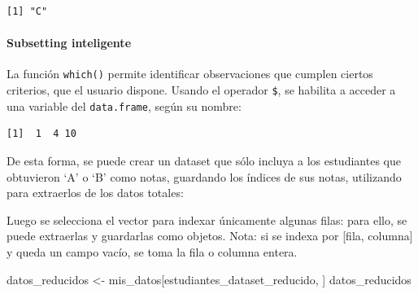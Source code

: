 \documentclass[
]{article}
\newenvironment{Shaded}{\begin{snugshade}}{\end{snugshade}}
\newcommand{\FunctionTok}[1]{\textcolor[rgb]{0.13,0.29,0.53}{\textbf{#1}}}
\newcommand{\NormalTok}[1]{#1}
\newcommand{\OtherTok}[1]{\textcolor[rgb]{0.56,0.35,0.01}{#1}}
\newcommand{\SpecialCharTok}[1]{\textcolor[rgb]{0.81,0.36,0.00}{\textbf{#1}}}
\newcommand{\StringTok}[1]{\textcolor[rgb]{0.31,0.60,0.02}{#1}}
\begin{document}
\begin{verbatim}
[1] "C"
\end{verbatim}

\hypertarget{subsetting-inteligente}{%
\paragraph{Subsetting inteligente}\label{subsetting-inteligente}}

La función \texttt{which()} permite identificar observaciones que cumplen ciertos criterios, que el usuario dispone. Usando el operador \texttt{\$}, se habilita a acceder a una variable del \texttt{data.frame}, según su nombre:

\begin{Shaded}
\end{Shaded}

\begin{verbatim}
[1]  1  4 10
\end{verbatim}

De esta forma, se puede crear un dataset que sólo incluya a los estudiantes que obtuvieron `A' o `B' como notas, guardando los índices de sus notas, utilizando para extraerlos de los datos totales:

\begin{Shaded}
\end{Shaded}

Luego se selecciona el vector para indexar únicamente algunas filas: para ello, se puede extraerlas y guardarlas como objetos. Nota: si se indexa por {[}fila, columna{]} y queda un campo vacío, se toma la fila o columna entera.

\begin{Shaded}
\begin{Highlighting}[]
\NormalTok{datos\_reducidos }\OtherTok{\textless{}{-}}\NormalTok{ mis\_datos[estudiantes\_dataset\_reducido, ]}
\NormalTok{datos\_reducidos}
\end{Highlighting}
\end{Shaded}
\end{document}
